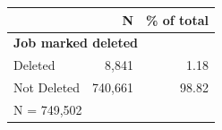 \begin{tabular}{lrr}


\toprule


 & N & \% of total \\


\midrule


\multicolumn{3}{l}{\textbf{Job marked deleted}}\\ 
\midrule
Deleted             &       8,841&        1.18\\
Not Deleted         &     740,661&       98.82\\
\midrule


\multicolumn{3}{l}{\footnotesize N =      749,502}\\


\bottomrule


\end{tabular}


